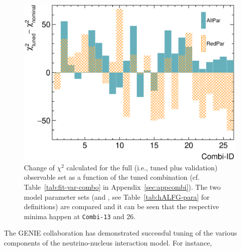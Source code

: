 \begin{figure}[!htb] 
    \centering 		
    \includegraphics[width=\sgfigwid\textwidth]{figures/tuning/chi2_hist_covfix.eps} 
    \caption{\label{fig:allchi} Change of $\chi^2$ calculated for the full (i.e., tuned plus validation) observable set as a function of the tuned combination (cf. Table~\ref{tab:fit-var-combo} in Appendix~\ref{sec:appcombi}). The two model parameter sets (\allpar and \redpar, see Table~\ref{tab:hALFG-para} for definitions) are compared and it can be seen that the respective minima happen at \texttt{Combi-13} and 26. }   
\end{figure}

The GENIE collaboration has demonstrated successful tuning of the various components of the neutrino-nucleus interaction model. 
For instance, 

